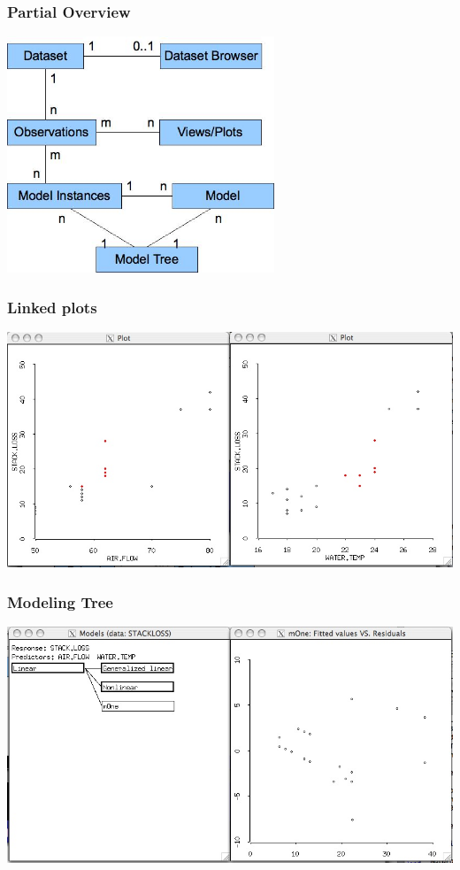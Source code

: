 \documentclass{beamer}
\begin{document}
\begin{frame}
\frametitle{Partial Overview}
\begin{center}
	\includegraphics[width=0.6\textwidth]{xstatR.jpg}
\end{center}
\end{frame}

\begin{frame}
\frametitle{Linked plots}
\includegraphics[width=\textwidth]{linkedPlots.jpg}
\end{frame}

\begin{frame}
\frametitle{Modeling Tree}
\includegraphics[width=\textwidth]{modeling.jpg}
\end{frame}
\end{document}
